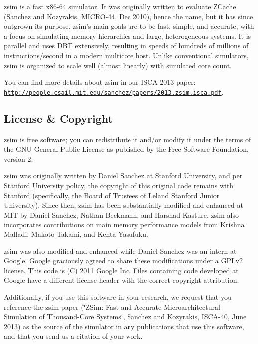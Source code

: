 zsim is a fast x86-\/64 simulator. It was originally written to evaluate Z\-Cache (Sanchez and Kozyrakis, M\-I\-C\-R\-O-\/44, Dec 2010), hence the name, but it has since outgrown its purpose. zsim's main goals are to be fast, simple, and accurate, with a focus on simulating memory hierarchies and large, heterogeneous systems. It is parallel and uses D\-B\-T extensively, resulting in speeds of hundreds of millions of instructions/second in a modern multicore host. Unlike conventional simulators, zsim is organized to scale well (almost linearly) with simulated core count.

You can find more details about zsim in our I\-S\-C\-A 2013 paper\-: \href{http://people.csail.mit.edu/sanchez/papers/2013.zsim.isca.pdf}{\tt http\-://people.\-csail.\-mit.\-edu/sanchez/papers/2013.\-zsim.\-isca.\-pdf}.

\subsection*{License \& Copyright }

zsim is free software; you can redistribute it and/or modify it under the terms of the G\-N\-U General Public License as published by the Free Software Foundation, version 2.

zsim was originally written by Daniel Sanchez at Stanford University, and per Stanford University policy, the copyright of this original code remains with Stanford (specifically, the Board of Trustees of Leland Stanford Junior University). Since then, zsim has been substantially modified and enhanced at M\-I\-T by Daniel Sanchez, Nathan Beckmann, and Harshad Kasture. zsim also incorporates contributions on main memory performance models from Krishna Malladi, Makoto Takami, and Kenta Yasufuku.

zsim was also modified and enhanced while Daniel Sanchez was an intern at Google. Google graciously agreed to share these modifications under a G\-P\-Lv2 license. This code is (C) 2011 Google Inc. Files containing code developed at Google have a different license header with the correct copyright attribution.

Additionally, if you use this software in your research, we request that you reference the zsim paper (\char`\"{}\-Z\-Sim\-: Fast and Accurate Microarchitectural
\-Simulation of Thousand-\/\-Core Systems\char`\"{}, Sanchez and Kozyrakis, I\-S\-C\-A-\/40, June 2013) as the source of the simulator in any publications that use this software, and that you send us a citation of your work.

